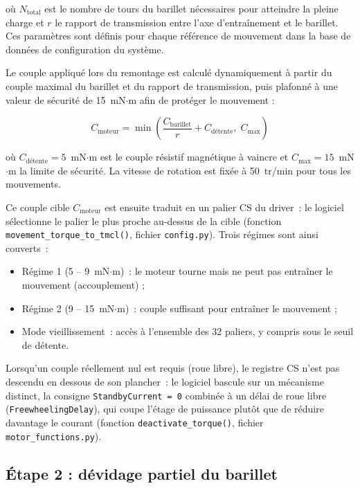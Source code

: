 où $N_{\text{total}}$ est le nombre de tours du barillet nécessaires pour
atteindre la pleine charge et $r$ le rapport de transmission entre l'axe
d'entraînement et le barillet. Ces paramètres sont définis pour chaque
référence de mouvement dans la base de données de configuration du système.

Le couple appliqué lors du remontage est calculé dynamiquement à partir du
couple maximal du barillet et du rapport de transmission, puis plafonné à
une valeur de sécurité de 15~mN$\cdot$m afin de protéger le mouvement :

\begin{equation}
    C_{\text{moteur}} = \min\!\left(
        \frac{C_{\text{barillet}}}{r} + C_{\text{détente}},\;
        C_{\text{max}}
    \right)
    \label{eq:couple}
\end{equation}

où $C_{\text{détente}} = 5$~mN$\cdot$m est le couple résistif magnétique à
vaincre et $C_{\text{max}} = 15$~mN$\cdot$m la limite de sécurité.
La vitesse de rotation est fixée à 50~tr/min pour tous les mouvements.

Ce couple cible $C_{\text{moteur}}$ est ensuite traduit en un palier CS du
driver~: le logiciel sélectionne le palier le plus proche au-dessus de la
cible (fonction \texttt{movement\_torque\_to\_tmcl()}, fichier
\texttt{config.py}). Trois régimes sont ainsi couverts~:
\begin{itemize}
    \item Régime 1 (5 -- 9~mN$\cdot$m)~: le moteur tourne mais ne peut pas
          entraîner le mouvement (accouplement) ;
    \item Régime 2 (9 -- 15~mN$\cdot$m)~: couple suffisant pour entraîner le
          mouvement ;
    \item Mode vieillissement~: accès à l'ensemble des 32 paliers, y compris
          sous le seuil de détente.
\end{itemize}
Lorsqu'un couple réellement nul est requis (roue libre), le registre CS
n'est pas descendu en dessous de son plancher~: le logiciel bascule sur un
mécanisme distinct, la consigne \texttt{StandbyCurrent~=~0} combinée à un
délai de roue libre (\texttt{FreewheelingDelay}), qui coupe l'étage de
puissance plutôt que de réduire davantage le courant (fonction
\texttt{deactivate\_torque()}, fichier \texttt{motor\_functions.py}).

\subsection{Étape 2 : dévidage partiel du barillet}

